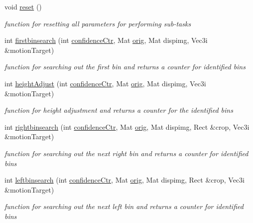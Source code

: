 \begin{DoxyCompactItemize}
void \hyperlink{classBinsTask_a83fc283bddeb24b6bc4772e372d6ff2f}{reset} ()
\begin{DoxyCompactList}\small\item\em function for resetting all parameters for performing sub-\/tasks \end{DoxyCompactList}\item 
int \hyperlink{classBinsTask_a26bee7a25e6dd7ae137caaf6e386b981}{firstbinsearch} (int \hyperlink{BinsTask_8cpp_ac559c47f5c7d297de44ad8e157f30eec}{confidence\+Ctr}, Mat \hyperlink{classBinsTask_aedf5f6032dcea5fbab09caed34cf80ac}{orig}, Mat dispimg, Vec3i \&motion\+Target)
\begin{DoxyCompactList}\small\item\em function for searching out the first bin and returns a counter for identified bins \end{DoxyCompactList}\item 
int \hyperlink{classBinsTask_a83227b34e66b476dcac18ef8be3912a0}{height\+Adjust} (int \hyperlink{BinsTask_8cpp_ac559c47f5c7d297de44ad8e157f30eec}{confidence\+Ctr}, Mat \hyperlink{classBinsTask_aedf5f6032dcea5fbab09caed34cf80ac}{orig}, Mat dispimg, Vec3i \&motion\+Target)
\begin{DoxyCompactList}\small\item\em function for height adjustment and returns a counter for the identified bins \end{DoxyCompactList}\item 
int \hyperlink{classBinsTask_adbcab6aaf2d23d8ccd14e19a9de5c788}{rightbinsearch} (int \hyperlink{BinsTask_8cpp_ac559c47f5c7d297de44ad8e157f30eec}{confidence\+Ctr}, Mat \hyperlink{classBinsTask_aedf5f6032dcea5fbab09caed34cf80ac}{orig}, Mat dispimg, Rect \&crop, Vec3i \&motion\+Target)
\begin{DoxyCompactList}\small\item\em function for searching out the next right bin and returns a counter for identified bins \end{DoxyCompactList}\item 
int \hyperlink{classBinsTask_a22689994f60be64be9a708fca637fe64}{leftbinsearch} (int \hyperlink{BinsTask_8cpp_ac559c47f5c7d297de44ad8e157f30eec}{confidence\+Ctr}, Mat \hyperlink{classBinsTask_aedf5f6032dcea5fbab09caed34cf80ac}{orig}, Mat dispimg, Rect \&crop, Vec3i \&motion\+Target)
\begin{DoxyCompactList}\small\item\em function for searching out the next left bin and returns a counter for identified bins \end{DoxyCompactList}\item 

\end{DoxyCompactItemize}
